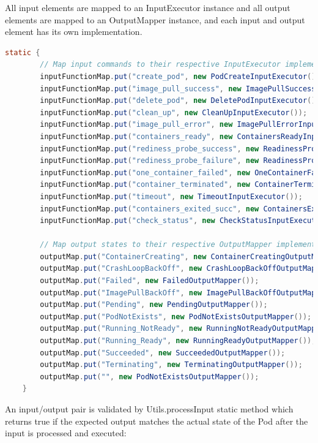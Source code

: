 \documentclass[main.tex]{subfiles}
\begin{document}
All input elements are mapped to an InputExecutor instance and all output elements are mapped to an OutputMapper instance, and each input and output element has its own implementation.

\begin{lstlisting}[language=Java]
static {
        // Map input commands to their respective InputExecutor implementations
        inputFunctionMap.put("create_pod", new PodCreateInputExecutor());
        inputFunctionMap.put("image_pull_success", new ImagePullSuccessInputExecutor());
        inputFunctionMap.put("delete_pod", new DeletePodInputExecutor());
        inputFunctionMap.put("clean_up", new CleanUpInputExecutor());
        inputFunctionMap.put("image_pull_error", new ImagePullErrorInputExecutor());
        inputFunctionMap.put("containers_ready", new ContainersReadyInputExecutor());
        inputFunctionMap.put("rediness_probe_success", new ReadinessProbeSuccessInputExecutor());
        inputFunctionMap.put("rediness_probe_failure", new ReadinessProbeFailureInputExecutor());
        inputFunctionMap.put("one_container_failed", new OneContainerFailedInputExecutor());
        inputFunctionMap.put("container_terminated", new ContainerTerminatedInputExecutor());
        inputFunctionMap.put("timeout", new TimeoutInputExecutor());
        inputFunctionMap.put("containers_exited_succ", new ContainersExitedSuccessInputExecutor());
        inputFunctionMap.put("check_status", new CheckStatusInputExecutor());

        // Map output states to their respective OutputMapper implementations
        outputMap.put("ContainerCreating", new ContainerCreatingOutputMapper());
        outputMap.put("CrashLoopBackOff", new CrashLoopBackOffOutputMapper());
        outputMap.put("Failed", new FailedOutputMapper());
        outputMap.put("ImagePullBackOff", new ImagePullBackOffOutputMapper());
        outputMap.put("Pending", new PendingOutputMapper());
        outputMap.put("PodNotExists", new PodNotExistsOutputMapper());
        outputMap.put("Running_NotReady", new RunningNotReadyOutputMapper());
        outputMap.put("Running_Ready", new RunningReadyOutputMapper());
        outputMap.put("Succeeded", new SucceededOutputMapper());
        outputMap.put("Terminating", new TerminatingOutputMapper());
        outputMap.put("", new PodNotExistsOutputMapper());
    }
\end{lstlisting}

An input/output pair is validated by Utils.processInput static method which returns true if the expected output matches the actual state of the Pod after the input is processed and executed: 
\end{document}
